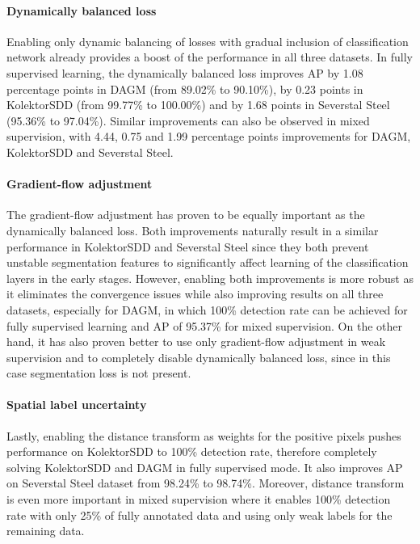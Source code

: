 \paragraph{Dynamically balanced loss}

Enabling only dynamic balancing of losses with gradual inclusion of classification network already provides a boost of the performance in all three datasets. In fully supervised learning, the dynamically balanced loss improves AP by 1.08 percentage points in DAGM (from 89.02\% to 90.10\%), by 0.23 points in KolektorSDD (from 99.77\% to 100.00\%) and by 1.68 points in Severstal Steel (95.36\% to 97.04\%). Similar improvements can also be observed in mixed supervision, with 4.44, 0.75 and 1.99 percentage points improvements for DAGM, KolektorSDD and Severstal Steel.

\paragraph{Gradient-flow adjustment}

The gradient-flow adjustment has proven to be equally important as the dynamically balanced loss. Both improvements naturally result in a similar performance in KolektorSDD and Severstal Steel since they both prevent unstable segmentation features to significantly affect learning of the classification layers in the early stages. 
However, enabling both improvements is more robust as it eliminates the convergence issues while also improving results on all three datasets, especially for DAGM, in which 100\% detection rate can be achieved for fully supervised learning and AP of 95.37\% for mixed supervision. On the other hand, it has also proven better to use only gradient-flow adjustment in weak supervision and to completely disable dynamically balanced loss, since in this case segmentation loss is not present. 

\paragraph{Spatial label uncertainty}

Lastly, enabling the distance transform as weights for the positive pixels pushes performance on KolektorSDD to 100\% detection rate, therefore completely solving KolektorSDD and DAGM in fully supervised mode. It also improves AP on Severstal Steel dataset from 98.24\% to 98.74\%. Moreover, distance transform is even more important in mixed supervision where it enables 100\% detection rate with only 25\% of fully annotated data and using only weak labels for the remaining data. 

